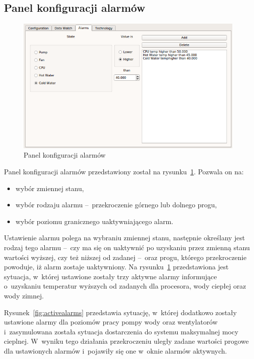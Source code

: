 \newpage
\subsection{Panel konfiguracji alarmów}
\indent

\begin{figure}[!ht]
    \centering
    \includegraphics[width=\textwidth]{../img/confalarms.png}
    \caption{Panel konfiguracji alarmów}
    \label{fig:confalarms}
\end{figure}

Panel konfiguracji alarmów przedstawiony został na rysunku~\ref{fig:confalarms}.
Pozwala on na:
\begin{itemize}
    \item wybór zmiennej stanu,
    \item wybór rodzaju alarmu --~przekroczenie górnego lub dolnego progu,
    \item wybór poziomu granicznego uaktywniającego alarm.
\end{itemize}

Ustawienie alarmu polega na wybraniu zmiennej stanu, następnie określany jest
rodzaj tego alarmu --~czy ma się on uaktywnić po uzyskaniu przez zmienną stanu
wartości wyższej, czy też niższej od zadanej --~oraz progu, którego
przekroczenie powoduje, iż alarm zostaje uaktywniony. Na
rysunku~\ref{fig:confalarms} przedstawiona jest sytuacja, w~której ustawione
zostały trzy aktywne alarmy informujące o~uzyskaniu temperatur wyższych od
zadanych dla procesora, wody ciepłej oraz wody zimnej.

Rysunek~\ref{fig:activealarms} przedstawia sytuację, w~której dodatkowo zostały
ustawione alarmy dla poziomów pracy pompy wody oraz wentylatorów i~zasymulowana
została sytuacja dostarczenia do systemu maksymalnej mocy cieplnej. W~wyniku
tego działania przekroczeniu uległy zadane wartości progowe dla ustawionych
alarmów i~pojawiły się one w~oknie alarmów aktywnych.

